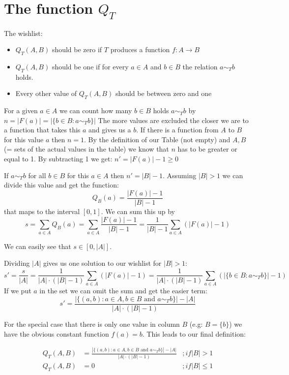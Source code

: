 \documentclass[a4paper]{article}
\begin{document}
\section{The function $Q_T$}

The wishlist:
\begin{itemize}
\item $Q_T(A,B)$ should be zero if $T$ produces a function $f : A \to B$
\item $Q_T(A,B)$ should be one if for every $a \in A$ and $b \in B$ the relation $a \sim_T b$ holds.
\item Every other value of $Q_T(A,B)$ should be between zero and one
\end{itemize}


For a given $a \in A$ we can count how many $b \in B$ holds $a \sim_T b$ by $n = |F(a)| = |\{ b \in B : a \sim_T b \}|$
The more values are excluded the closer we are to a function that takes this $a$ and gives us a $b$.
If there is a function from $A$ to $B$ for this value $a$ then $n = 1$.
By the definition of our Table (not empty) and $A, B$ (= sets of the actual values in the table) we know that $n$ has to be greater or equal to 1.
By subtracting 1 we get: $n' = |F(a)| - 1 \geq 0$

If $a \sim_T b$ for all $b\in B$ for this $a \in A$ then $n' = |B| - 1$.
Assuming $|B| > 1$ we can divide this value and get the function:
\[
  Q_B(a) = \frac{|F(a)| - 1}{|B| - 1}
\]
that maps to the interval $[0, 1]$.
We can sum this up by 
\[
  s = \sum_{a \in A} Q_B(a)
  = \sum_{a \in A} \frac{|F(a)| - 1}{|B| - 1}
  = \frac{1}{|B| - 1} \sum_{a \in A} (|F(a)| - 1)
\]

We can easily see that $s \in [0, |A|]$.

Dividing $|A|$ gives us one solution to our wishlist for $|B| > 1$:
\[
  s' = \frac{s}{|A|}
  = \frac{1}{|A| \cdot (|B| - 1)} \sum_{a \in A} (|F(a)| - 1)
  = \frac{1}{|A| \cdot (|B| - 1)} \sum_{a \in A} (|\{ b \in B : a \sim_T b \}| - 1)
\]
If we put $a$ in the set we can omit the sum and get the easier term:
\[
  s' = \frac{|\{ (a,b) : a \in A, b \in B \mbox{ and } a \sim_T b \}| - |A|}{|A| \cdot (|B| - 1)}
\]

For the special case that there is only one value in column $B$ (e.g: $B = \{ b \}$) we have the obvious constant function $f(a) = b$.
This leads to our final definition:

\begin{equation}
\begin{array}{lll}
 Q_T( A, B ) & = \frac{|\{ (a,b) : a \in A, b \in B \mbox{ and } a \sim_T b \}| - |A|}{|A| \cdot (|B| - 1)} & ; if |B| > 1 \\
 Q_T(A, B)   & = 0  & ; if |B| \leq 1 
\end{array}
\end{equation}
\end{document}
